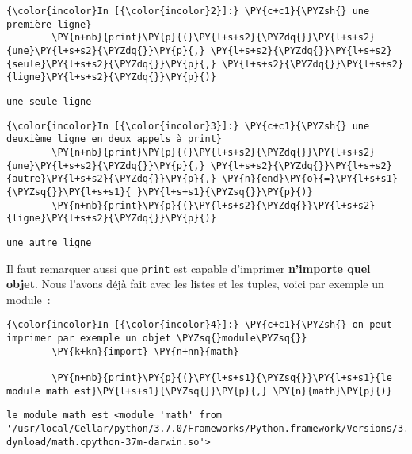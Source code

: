     \begin{Verbatim}[commandchars=\\\{\}]
{\color{incolor}In [{\color{incolor}2}]:} \PY{c+c1}{\PYZsh{} une première ligne}
        \PY{n+nb}{print}\PY{p}{(}\PY{l+s+s2}{\PYZdq{}}\PY{l+s+s2}{une}\PY{l+s+s2}{\PYZdq{}}\PY{p}{,} \PY{l+s+s2}{\PYZdq{}}\PY{l+s+s2}{seule}\PY{l+s+s2}{\PYZdq{}}\PY{p}{,} \PY{l+s+s2}{\PYZdq{}}\PY{l+s+s2}{ligne}\PY{l+s+s2}{\PYZdq{}}\PY{p}{)}
\end{Verbatim}


    \begin{Verbatim}[commandchars=\\\{\}]
une seule ligne

    \end{Verbatim}

    \begin{Verbatim}[commandchars=\\\{\}]
{\color{incolor}In [{\color{incolor}3}]:} \PY{c+c1}{\PYZsh{} une deuxième ligne en deux appels à print}
        \PY{n+nb}{print}\PY{p}{(}\PY{l+s+s2}{\PYZdq{}}\PY{l+s+s2}{une}\PY{l+s+s2}{\PYZdq{}}\PY{p}{,} \PY{l+s+s2}{\PYZdq{}}\PY{l+s+s2}{autre}\PY{l+s+s2}{\PYZdq{}}\PY{p}{,} \PY{n}{end}\PY{o}{=}\PY{l+s+s1}{\PYZsq{}}\PY{l+s+s1}{ }\PY{l+s+s1}{\PYZsq{}}\PY{p}{)}
        \PY{n+nb}{print}\PY{p}{(}\PY{l+s+s2}{\PYZdq{}}\PY{l+s+s2}{ligne}\PY{l+s+s2}{\PYZdq{}}\PY{p}{)}
\end{Verbatim}


    \begin{Verbatim}[commandchars=\\\{\}]
une autre ligne

    \end{Verbatim}

    Il faut remarquer aussi que \texttt{print} est capable d'imprimer
\textbf{n'importe quel objet}. Nous l'avons déjà fait avec les listes et
les tuples, voici par exemple un module~:

    \begin{Verbatim}[commandchars=\\\{\}]
{\color{incolor}In [{\color{incolor}4}]:} \PY{c+c1}{\PYZsh{} on peut imprimer par exemple un objet \PYZsq{}module\PYZsq{}}
        \PY{k+kn}{import} \PY{n+nn}{math}
        
        \PY{n+nb}{print}\PY{p}{(}\PY{l+s+s1}{\PYZsq{}}\PY{l+s+s1}{le module math est}\PY{l+s+s1}{\PYZsq{}}\PY{p}{,} \PY{n}{math}\PY{p}{)}
\end{Verbatim}


    \begin{Verbatim}[commandchars=\\\{\}]
le module math est <module 'math' from '/usr/local/Cellar/python/3.7.0/Frameworks/Python.framework/Versions/3.7/lib/python3.7/lib-dynload/math.cpython-37m-darwin.so'>

    \end{Verbatim}

